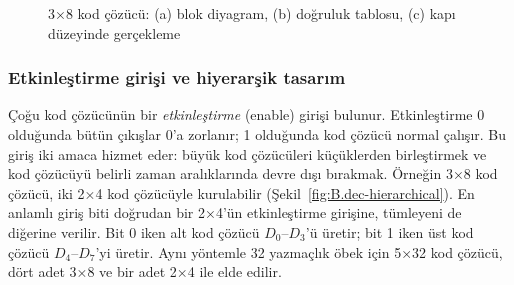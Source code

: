 \begin{figure}[H]
\caption[3×8 kod çözücü]{3×8 kod çözücü: (a) blok diyagram, (b) doğruluk tablosu, (c) kapı düzeyinde gerçekleme}
\label{fig:B.10}
\end{figure}

\subsubsection{Etkinleştirme girişi ve hiyerarşik tasarım}
Çoğu kod çözücünün bir \emph{etkinleştirme} (enable) girişi bulunur. Etkinleştirme 0 olduğunda bütün çıkışlar 0'a zorlanır; 1 olduğunda kod çözücü normal çalışır. Bu giriş iki amaca hizmet eder: büyük kod çözücüleri küçüklerden birleştirmek ve kod çözücüyü belirli zaman aralıklarında devre dışı bırakmak. Örneğin 3×8 kod çözücü, iki 2×4 kod çözücüyle kurulabilir (Şekil~\ref{fig:B.dec-hierarchical}). En anlamlı giriş biti doğrudan bir 2×4'ün etkinleştirme girişine, tümleyeni de diğerine verilir. Bit 0 iken alt kod çözücü $D_0$--$D_3$'ü üretir; bit 1 iken üst kod çözücü $D_4$--$D_7$'yi üretir. Aynı yöntemle 32 yazmaçlık öbek için 5×32 kod çözücü, dört adet 3×8 ve bir adet 2×4 ile elde edilir.

